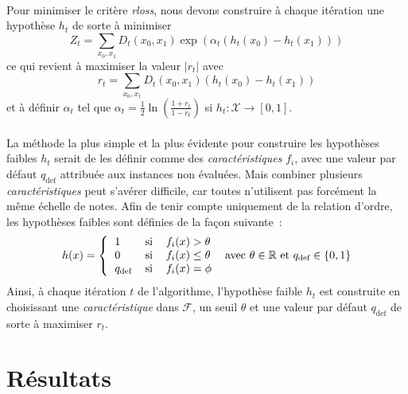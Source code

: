 \documentclass[pdftex,a4paper,11pt]{article}
\begin{document}
\paragraph{}
Pour minimiser le critère \emph{rloss}, nous devons construire à chaque itération une hypothèse $h_t$ de sorte à minimiser
\[
    Z_t = \sum_{x_0, x_1} D_t(x_0, x_1) \exp(\alpha_t(h_t(x_0) - h_t(x_1)))
\]
ce qui revient à maximiser la valeur $|r_t|$ avec
\[
    r_t = \sum_{x_0, x_1} D_t(x_0, x_1) (h_t(x_0) - h_t(x_1))
\]
et à définir $\alpha_t$ tel que
$
    \alpha_t = \frac{1}{2} \ln \left( \frac{1+r_t}{1-r_t} \right)
$
si $h_t : \mathcal{X} \to [0, 1]$.

\paragraph{}
La méthode la plus simple et la plus évidente pour construire les hypothèses faibles $h_t$ serait de les définir comme des \emph{caractéristiques} $f_i$, avec une valeur par défaut $q_\text{def}$ attribuée aux instances non évaluées.
Mais combiner plusieurs \emph{caractéristiques} peut s’avérer difficile, car toutes n’utilisent pas forcément la même échelle de notes. 
Afin de tenir compte uniquement de la relation d'ordre, les hypothèses faibles sont définies de la façon suivante~:
\[
    h(x) = 
    \left\{
    \begin{tabular}{lcl}
          1                 & si & $f_i(x)  >   \theta$ \\
          0                 & si & $f_i(x) \leq \theta$ \\
          $q_{\text{def}}$  & si & $f_i(x)  =   \phi$
    \end{tabular}
    \right.
    \text{ avec } \theta \in \mathbb{R} \text{ et } q_{\text{def}} \in \{0, 1\}
\]
Ainsi, à chaque itération $t$ de l'algorithme, l'hypothèse faible $h_t$ est construite en choisissant une \emph{caractéristique} dans $\mathcal{F}$, un seuil $\theta$ et une valeur par défaut $q_{\text{def}}$ de sorte à maximiser $r_t$.


\section{Résultats}
\end{document}
